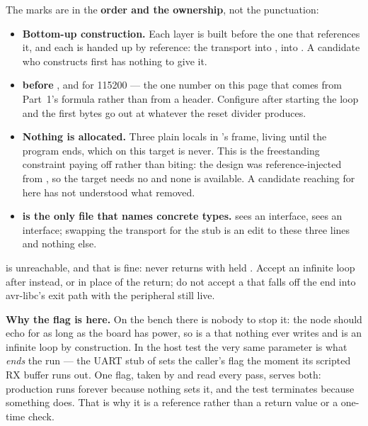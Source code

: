 The marks are in the \textbf{order and the ownership}, not the punctuation:
\begin{itemize}
  \item \textbf{Bottom-up construction.} Each layer is built before the one that references it, and
    each is handed up by reference: the transport into ,  into
    . A candidate who constructs  first has nothing to give it.
  \item \textbf{ before }, and  for 115200 --- the one number
    on this page that comes from Part~1's formula rather than from a header. Configure after starting
    the loop and the first bytes go out at whatever the reset divider produces.
  \item \textbf{Nothing is allocated.} Three plain locals in 's frame, living until the
    program ends, which on this target is never. This is the freestanding constraint paying off
    rather than biting: the design was reference-injected from , so the target needs no
     and none is available. A candidate reaching for  here has not
    understood what  removed.
  \item \textbf{ is the only file that names concrete types.}  sees an
    interface,  sees an interface; swapping the transport for the  stub is an
    edit to these three lines and nothing else.
\end{itemize}

 is unreachable, and that is fine:  never returns with  held
. Accept an infinite loop after  instead, or  in place of the
return; do not accept a  that falls off the end into avr-libc's exit path with the
peripheral still live.

\textbf{Why the flag is  here.} On the bench there is nobody to stop it: the node should
echo for as long as the board has power, so  is a  that nothing ever writes
and  is an infinite loop by construction. In the host test the very same parameter is
what \emph{ends} the run --- the UART stub of  sets the caller's flag  the
moment its scripted RX buffer runs out. One flag, taken by  and read every pass,
serves both: production runs forever because nothing sets it, and the test terminates because
something does. That is why it is a reference rather than a return value or a one-time check.

